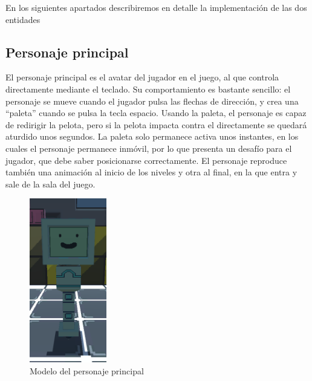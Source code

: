 En los siguientes apartados describiremos en detalle la implementación de las dos entidades


\subsection{Personaje principal}
El personaje principal es el avatar del jugador en el juego, al que controla directamente mediante el teclado. Su comportamiento es bastante sencillo: el personaje se mueve cuando el jugador pulsa las flechas de dirección, y crea una ``paleta'' cuando se pulsa la tecla espacio. Usando la paleta, el personaje es capaz de redirigir la pelota, pero si la pelota impacta contra el directamente se quedará aturdido unos segundos. La paleta solo permanece activa unos instantes, en los cuales el personaje permanece inmóvil, por lo que presenta un desafío para el jugador, que debe saber posicionarse correctamente. El personaje reproduce también una animación al inicio de los niveles y otra al final, en la que entra y sale de la sala del juego.

\begin{figure}[h]
	\includegraphics[width=0.30\textwidth]{images/estructura/fisica/flick_happy_small}
	\centering
	\caption{Modelo del personaje principal}
\end{figure}

